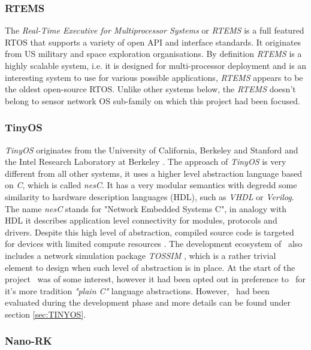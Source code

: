  \subsubsection{RTEMS} \label{sec:rtos:rtems}

 The \emph{Real-Time Executive for Multiprocessor Systems} or \emph{RTEMS} is a
 full featured RTOS that supports a variety of open API and interface standards.
 It originates from US military and space exploration organisations. By definition
 \emph{RTEMS} is a highly scalable system, i.e. it is designed for multi-processor 
 deployment and is an interesting system to use for various possible applications,
 \emph{RTEMS} appears to be the oldest open-source RTOS. Unlike other systems below,
 the \emph{RTEMS} doesn't belong to sensor network OS sub-family on which this
 project had been focused. 


\subsubsection{TinyOS} \label{sec:rtos:tinyos}

 \emph{TinyOS} originates from the University of California, Berkeley and
 Stanford and the Intel Research Laboratory at Berkeley \cite{wiki:tinyos,
 links:tinyos:webs, links:tinyos:homepage}. The approach of \emph{TinyOS}
 is very different from all other systems, it uses a higher level abstraction
 language based on \emph{C}, which is called \emph{nesC}. It has a very
 modular semantics with degredd some similarity to hardware description
 languages (HDL), such as \emph{VHDL} or \emph{Verilog}. The name \emph{nesC}
 stands for "Network Embedded Systems C", in analogy with HDL it describes
 application level connectivity for modules, protocols and drivers. Despite
 this high level of abstraction, compiled source code is targeted for devices
 with limited compute resources \cite{links:tinyos:nesc}. The development
 ecosystem of \TinyOS\ also includes a network simulation package \emph{TOSSIM}
 \cite{links:tinyos:tossim}, which is a rather trivial element to design when
 such level of abstraction is in place. At the start of the project \TinyOS\
 was of some interest, however it had been opted out in preference to \Contiki\
 for it's more tradition \emph{"plain C"} language abstractions. However,
 \TinyOS\ had been evaluated during the development phase and more details
 can be found under section \ref{sec:TINYOS}.



\subsubsection{Nano-RK} \label{sec:rtos:nanork}

